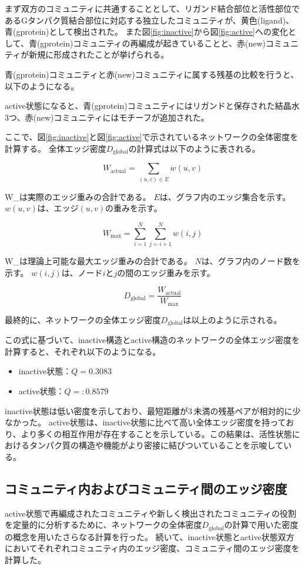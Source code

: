 まず双方のコミュニティに共通することとして、リガンド結合部位と活性部位であるGタンパク質結合部位に対応する独立したコミュニティが、黄色(ligand)、青(gprotein)として検出された。
また図\ref{fig:inactive}から図\ref{fig:active}への変化として、青(gprotein)コミュニティの再編成が起きていることと、赤(new)コミュニティが新規に形成されたことが挙げられる。

青(gprotein)コミュニティと赤(new)コミュニティに属する残基の比較を行うと、以下のようになる。


active状態になると、青(gprotein)コミュニティにはリガンドと保存された結晶水3つ、赤(new)コミュニティにはモチーフが追加された。

ここで、図\ref{fig:inactive}と図\ref{fig:active}で示されているネットワークの全体密度を計算する。
全体エッジ密度$D_{\text{global}}$の計算式は以下のように表される。

\[
W_{\text{actual}} = \sum_{(u, v) \in E} w(u, v)
\]

W_{}は実際のエッジ重みの合計である。
$E$は、グラフ内のエッジ集合を示す。
$w(u, v)$は、エッジ$(u, v)$の重みを示す。

\[
W_{\text{max}} = \sum_{i=1}^{N} \sum_{j=i+1}^{N} w(i, j)
\]

W_{}は理論上可能な最大エッジ重みの合計である。
$N$は、グラフ内のノード数を示す。
$w(i, j)$は、ノード$i$と$j$の間のエッジ重みを示す。

\[
D_{\text{global}} = \frac{W_{\text{actual}}}{W_{\text{max}}}
\label{eq:global_density}
\]

最終的に、ネットワークの全体エッジ密度$D_{\text{global}}$は以上のように示される。

この式に基づいて、inactive構造とactive構造のネットワークの全体エッジ密度を計算すると、それぞれ以下のようになる。
\begin{itemize}
    \item inactive状態：\( Q = 0.3083 \)
    \item active状態：\( Q = :0.8579 \)
\end{itemize}

inactive状態は低い密度を示しており、最短距離が3\,\text{\AA}未満の残基ペアが相対的に少なかった。
active状態は、inactive状態に比べて高い全体エッジ密度を持っており、より多くの相互作用が存在することを示している。この結果は、活性状態におけるタンパク質の構造や機能がより密接に結びついていることを示唆している。

\subsection{コミュニティ内およびコミュニティ間のエッジ密度}
active状態で再編成されたコミュニティや新しく検出されたコミュニティの役割を定量的に分析するために、ネットワークの全体密度$D_{\text{global}}$の計算で用いた密度の概念を用いたさらなる計算を行った。
続いて、inactive状態とactive状態双方においてそれぞれコミュニティ内のエッジ密度、コミュニティ間のエッジ密度を計算した。

